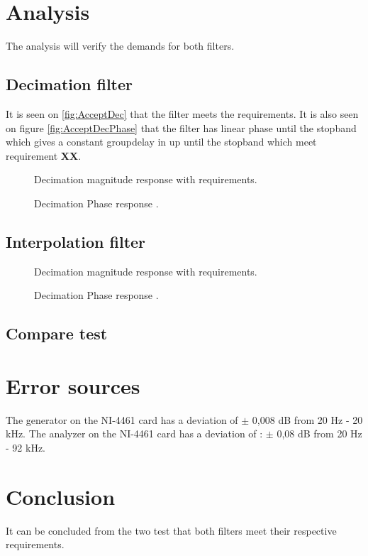 \section{Analysis}
The analysis will verify the demands for both filters.

\subsection*{Decimation filter}
It is seen on \autoref{fig:AcceptDec} that the filter meets the requirements. It is also seen on figure \autoref{fig:AcceptDecPhase} that the filter has linear phase until the stopband which gives a constant groupdelay in up until the stopband which meet requirement \textbf{XX}. 
\begin{figure}[H]
	\centering
	
	\caption{Decimation magnitude response with requirements.}
	\label{fig:acceptDecMag}
\end{figure}
\begin{figure}[H]
	\centering
	
	\caption{Decimation Phase response .}
	\label{fig:AcceptDecPhase}
\end{figure}


\subsection*{Interpolation filter}

\begin{figure}[H]
	\centering
	
	\caption{Decimation magnitude response with requirements.}
	\label{fig:acceptIntMag}
\end{figure}
\begin{figure}[H]
	\centering
	
	\caption{Decimation Phase response .}
	\label{fig:AcceptIntPhase}
\end{figure}


\subsection*{Compare test}


\section{Error sources}
The generator on the NI-4461 card has a deviation of $\pm$ 0,008 dB from 20 Hz - 20 kHz. The analyzer on the NI-4461 card has a deviation of : $\pm$ 0,08 dB from 20 Hz - 92 kHz. 

\section{Conclusion}
It can be concluded from the two test that both filters meet their respective requirements.